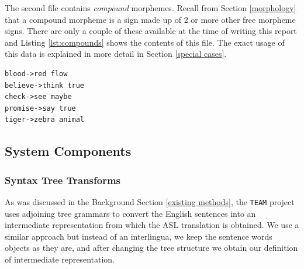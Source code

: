 \documentclass[12pt]{ociamthesis}  %
\newcommand{\tech}{\texttt}
\begin{document}
The second file contains \textit{compound} morphemes. Recall from Section \ref{morphology} that a compound morpheme is a sign made up of 2 or more other free morpheme signs. There are only a couple of these available at the time of writing this report and Listing \ref{lst:compounds} shows the contents of this file. The exact usage of this data is explained in more detail in Section \ref{special cases}.
\begin{lstlisting}[language=Rules,mathescape=true, caption = \texttt{compound\_morphemes.txt} file, label = lst:compounds]
blood->red flow
believe->think true
check->see maybe
promise->say true
tiger->zebra animal
\end{lstlisting}

\subsection{System Components}
\subsubsection{Syntax Tree Transforms}

As was discussed in the Background Section \ref{existing methods}, the \tech{TEAM} project uses adjoining tree grammars to convert the English sentences into an intermediate representation from which the ASL translation is obtained. We use a similar approach but instead of an interlingua, we keep the sentence words objects as they are, and after changing the tree structure we obtain our definition of intermediate representation. 
\end{document}
